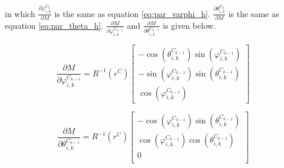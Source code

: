 \noindent in which $\frac{\partial \varphi _{i, k}^{C_{k}}}{\partial
  M}$ is the same as equation \ref{eq:par_varphi_h}. $\frac{\partial
  \theta _{i, k}^{C_{k}}}{\partial M}$ is the same as equation
\ref{eq:par_theta_h}. $\frac{\partial M}{\partial \varphi
  _{i,k}^{C_{k-1}}}$ and $ \frac{\partial M}{\partial \theta _{i,
    k}^{C_{k-1}}}$ is given below.

\begin{equation}
\frac{\partial M}{\partial \varphi_{i,k}^{C_{k-1}}}=
R^{-1}(r^{C})\begin{bmatrix}
-\cos(\theta_{i, k}^{C_{k-1}})\sin(\varphi_{i,k}^{C_{k-1}}) \\
-\sin(\varphi_{i,k}^{C_{k-1}})\sin(\theta_{i, k}^{C_{k-1}}) \\
\cos (\varphi_{i,k}^{C_{k-1}})
\end{bmatrix}
\end{equation}

\begin{equation}
\frac{\partial M}{\partial \theta _{i,k}^{C_{k-1}}}=
R^{-1}(r^{C}) \begin{bmatrix}
-\cos(\varphi_{i,k}^{C_{k-1}})\sin(\theta_{i, k}^{C_{k-1}})\\
\cos(\varphi_{i,k}^{C_{k-1}})\cos(\theta_{i, k}^{C_{k-1}})\\
0\\
\end{bmatrix}
\end{equation}

